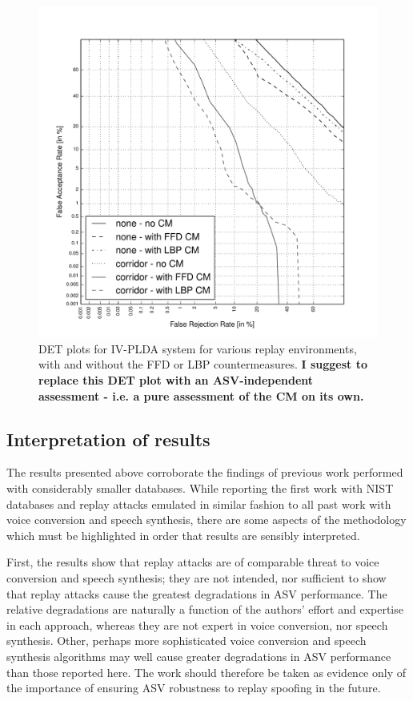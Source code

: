 \begin{figure}
	\centering
\includegraphics[width=1\linewidth]{Figs/DET_IVPLDA_counter_iPad.pdf}
	\caption{DET plots for IV-PLDA system for various replay environments, with and without the FFD or LBP countermeasures. {\bfseries  I suggest to replace this DET plot with an ASV-independent assessment - i.e. a pure assessment of the CM on its own.}}
	\label{fig::DETs_CM}
\end{figure}



\subsection{Interpretation of results}

The results presented above corroborate the findings of previous work performed with considerably smaller databases.  While reporting the first work with NIST databases and replay attacks emulated in similar fashion to all past work with voice conversion and speech synthesis, there are some aspects of the methodology which must be highlighted in order that results are sensibly interpreted.

First, the results show that replay attacks are of comparable threat to voice conversion and speech synthesis; they are not intended, nor sufficient to show that replay attacks cause the greatest degradations in ASV performance.  The relative degradations are naturally a function of the authors' effort and expertise in each approach, whereas they are not expert in voice conversion, nor speech synthesis.  Other, perhaps more sophisticated voice conversion and speech synthesis algorithms may well cause greater degradations in ASV performance than those reported here.  The work should therefore be taken as evidence only of the importance of ensuring ASV robustness to replay spoofing in the future.


